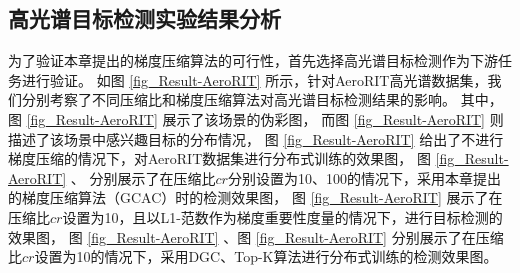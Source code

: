 \documentclass{xdupgthesis}
\begin{document}
\subsection{高光谱目标检测实验结果分析}
\label{chapter3-3-2}
为了验证本章提出的梯度压缩算法的可行性，首先选择高光谱目标检测作为下游任务进行验证。
如图 \ref{fig_Result-AeroRIT} 所示，针对AeroRIT高光谱数据集，我们分别考察了不同压缩比和梯度压缩算法对高光谱目标检测结果的影响。
其中，图 \ref{fig_Result-AeroRIT}  展示了该场景的伪彩图，
而图 \ref{fig_Result-AeroRIT}  则描述了该场景中感兴趣目标的分布情况，
图 \ref{fig_Result-AeroRIT}  给出了不进行梯度压缩的情况下，对AeroRIT数据集进行分布式训练的效果图，
图 \ref{fig_Result-AeroRIT} 、
分别展示了在压缩比$cr$分别设置为10、100的情况下，采用本章提出的梯度压缩算法（GCAC）时的检测效果图，
图 \ref{fig_Result-AeroRIT}  展示了在压缩比$cr$设置为10，且以L1-范数作为梯度重要性度量的情况下，进行目标检测的效果图，
图 \ref{fig_Result-AeroRIT}  、图 \ref{fig_Result-AeroRIT}  分别展示了在压缩比$cr$设置为10的情况下，采用DGC、Top-K算法进行分布式训练的检测效果图。
\end{document}
